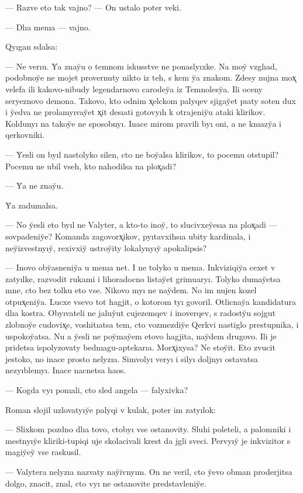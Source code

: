 \documentclass[10pt]{book}
\begin{document}
— Razve eto tak vajno? — On ustalo poter veki.

— Dlıa menıa — vajno.

Qyıgan sdalsa:

— Ne verıu. Y̆a znay̆u o temnom iskusstve ne ponaslyıxke. Na moy̆ vzglıad, podobnoy̆e ne mojet provernuty nikto iz teh, s kem y̆a znakom. Zdesy nujna mox̨ velefa ili kakovo-nibudy legendarnovo carodey̆a iz Temnolesy̆a. Ili oceny seryeznovo demona. Takovo, kto odnim x̨elckom palyqev sjigay̆et pıaty soten dux i y̆edva ne prolamyıvay̆et x̨it desıati gotovyıh k otrajeniy̆u ataki klirikov. Koldunyı na takoy̆e ne sposobnyı. Inace mirom pravili byı oni, a ne knıazy̆a i qerkovniki.

— Y̆esli on byıl nastolyko silen, cto ne boy̆alsa klirikov, to pocemu otstupil? Pocemu ne ubil vseh, kto nahodilsa na plox̨adi?

— Y̆a ne znay̆u.

Y̆a zadumalsa.

— No y̆esli eto byıl ne Valyter, a kto-to inoy̆, to slucivxey̆esıa na plox̨adi — sovpadeniy̆e? Komanda zagovorx̨ikov, pyıtavxihsıa ubity kardinala, i ney̆izvestnyıy̆, rexivxiy̆ ustroy̆ity lokalynyıy̆ apokalipsis?

— Inovo oby̆asneniy̆a u menıa net. I ne tolyko u menıa. Inkviziqiy̆a cexet v zatyılke, razvodit rukami i lihoradocno listay̆et grimuaryı. Tolyko dumay̆etsa mne, cto bez tolku eto vse. Nikovo myı ne nay̆dem. No im nujen kozel otpux̨eniy̆a. Lucxe vsevo tot hagjit, o kotorom tyı govoril. Otlicnay̆a kandidatura dlıa kostra. Obyıvateli ne jaluy̆ut cujezemqev i inoverqev, s radosty̆u sojgut zlobnoy̆e cudovix̨e, voshitıatsa tem, cto vozmezdiy̆e Qerkvi nastiglo prestupnika, i uspokoy̆atsa. Nu a y̆esli ne poy̆may̆em etovo hagjita, nay̆dem drugovo. Ili je pridetsa ispolyzovaty bednıagu-aptekarıa. Morx̨ixysa? Ne stoy̆it. Eto zvucit jestoko, no inace prosto nelyzıa. Simvolyı veryı i silyı doljnyı ostavatsa nezyıblemyı. Inace nacnetsa haos.

— Kogda vyı ponıali, cto sled angela — falyxivka?

Roman slojil uzlovatyıy̆e palyqi v kulak, poter im zatyılok:

— Slixkom pozdno dlıa tovo, ctobyı vse ostanovity. Sluhi poleteli, a palomniki i mestnyıy̆e kliriki-tupiqi uje skolacivali krest da jgli sveci. Pervyıy̆ je inkvizitor s magiy̆ey̆ vse raskusil.

— Valytera nelyzıa nazvaty nay̆ivnyım. On ne veril, cto y̆evo obman proderjitsa dolgo, znacit, znal, cto vyı ne ostanovite predstavleniy̆e.
\end{document}
